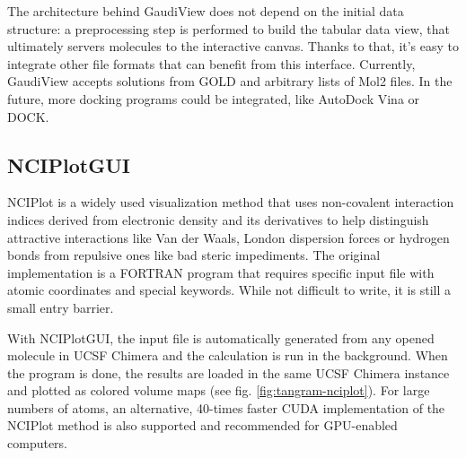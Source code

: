 The architecture behind GaudiView does not depend on the initial data structure: a preprocessing step is performed to build the tabular data view, that ultimately servers molecules to the interactive canvas. Thanks to that, it's easy to integrate other file formats that can benefit from this interface. Currently, GaudiView accepts solutions from GOLD and arbitrary lists of Mol2 files. In the future, more docking programs could be integrated, like AutoDock Vina or DOCK.

\subsection{NCIPlotGUI}
NCIPlot is a widely used visualization method\cite{nciplot} that uses non-covalent interaction indices derived from electronic density and its derivatives to help distinguish attractive interactions like Van der Waals, London dispersion forces or hydrogen bonds from repulsive ones like bad steric impediments. The original implementation is a FORTRAN program that requires specific input file with atomic coordinates and special keywords. While not difficult to write, it is still a small entry barrier.

With NCIPlotGUI, the input file is automatically generated from any opened molecule in UCSF Chimera and the calculation is run in the background. When the program is done, the results are loaded in the same UCSF Chimera instance and plotted as colored volume maps (see fig. \ref{fig:tangram-nciplot}). For large numbers of atoms, an alternative, 40-times faster CUDA implementation of the NCIPlot method\cite{nciplotcuda} is also supported and recommended for GPU-enabled computers.



